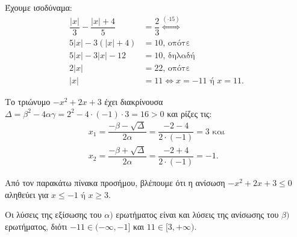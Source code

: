 
\begin{alist}
\item Έχουμε ισοδύναμα:
\begin{align*}
\dfrac{|x|}{3} - \dfrac{|x| + 4}{5} &= \dfrac{2}{3} \overset{(\cdot 15)}{\Leftrightarrow} \\
5|x| - 3(|x| + 4) &= 10\text{, οπότε} \\
5|x| - 3|x| - 12 &= 10\text{, δηλαδή} \\
2|x| &= 22\text{, οπότε} \\
|x| &= 11\Leftrightarrow x = -11 \text{ ή } x = 11.
\end{align*}

\item Το τριώνυμο $-x^2 + 2x + 3$ έχει διακρίνουσα $\Delta = \beta^2 - 4\alpha\gamma = 2^2 - 4 \cdot (-1) \cdot 3 = 16 > 0$ και ρίζες τις:
\begin{gather*}
x_1 = \dfrac{-\beta - \sqrt{\Delta}}{2\alpha} = \dfrac{-2 - 4}{2 \cdot (-1)} = 3\text{ και} \\
x_2 = \dfrac{-\beta + \sqrt{\Delta}}{2\alpha} = \dfrac{-2 + 4}{2 \cdot (-1)} = -1.
\end{gather*}

Από τον παρακάτω πίνακα προσήμου, βλέπουμε ότι η ανίσωση $-x^2 + 2x + 3 \le 0$ αληθεύει για $x \le -1 \text{ ή } x \ge 3$.

\begin{center}
\end{center}

\item Οι λύσεις της εξίσωσης του $\alpha)$ ερωτήματος είναι και λύσεις της ανίσωσης του $\beta)$ ερωτήματος, διότι $-11 \in (-\infty, -1]$ και $11 \in [3, +\infty)$.
\end{alist}


